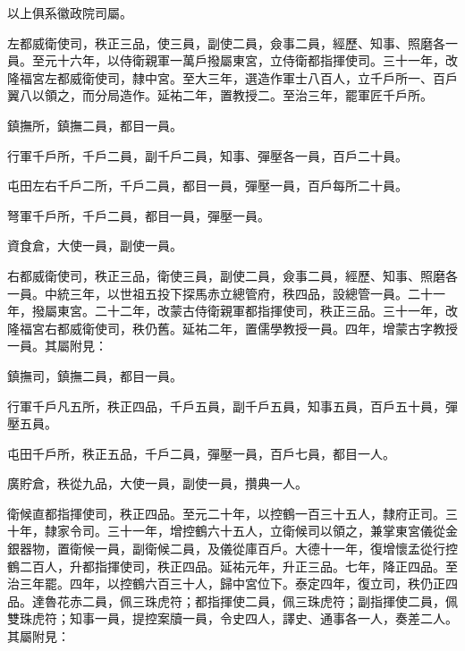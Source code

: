 \begin{pinyinscope}
 以上俱系徽政院司屬。



 左都威衛使司，秩正三品，使三員，副使二員，僉事二員，經歷、知事、照磨各一員。至元十六年，以侍衛親軍一萬戶撥屬東宮，立侍衛都指揮使司。三十一年，改隆福宮左都威衛使司，隸中宮。至大三年，選造作軍士八百人，立千戶所一、百戶翼八以領之，而分局造作。延祐二年，置教授二。至治三年，罷軍匠千戶所。



 鎮撫所，鎮撫二員，都目一員。



 行軍千戶所，千戶二員，副千戶二員，知事、彈壓各一員，百戶二十員。



 屯田左右千戶二所，千戶二員，都目一員，彈壓一員，百戶每所二十員。



 弩軍千戶所，千戶二員，都目一員，彈壓一員。



 資食倉，大使一員，副使一員。



 右都威衛使司，秩正三品，衛使三員，副使二員，僉事二員，經歷、知事、照磨各一員。中統三年，以世祖五投下探馬赤立總管府，秩四品，設總管一員。二十一年，撥屬東宮。二十二年，改蒙古侍衛親軍都指揮使司，秩正三品。三十一年，改隆福宮右都威衛使司，秩仍舊。延祐二年，置儒學教授一員。四年，增蒙古字教授一員。其屬附見：



 鎮撫司，鎮撫二員，都目一員。



 行軍千戶凡五所，秩正四品，千戶五員，副千戶五員，知事五員，百戶五十員，彈壓五員。



 屯田千戶所，秩正五品，千戶二員，彈壓一員，百戶七員，都目一人。



 廣貯倉，秩從九品，大使一員，副使一員，攢典一人。



 衛候直都指揮使司，秩正四品。至元二十年，以控鶴一百三十五人，隸府正司。三十年，隸家令司。三十一年，增控鶴六十五人，立衛候司以領之，兼掌東宮儀從金銀器物，置衛候一員，副衛候二員，及儀從庫百戶。大德十一年，復增懷孟從行控鶴二百人，升都指揮使司，秩正四品。延祐元年，升正三品。七年，降正四品。至治三年罷。四年，以控鶴六百三十人，歸中宮位下。泰定四年，復立司，秩仍正四品。達魯花赤二員，佩三珠虎符；都指揮使二員，佩三珠虎符；副指揮使二員，佩雙珠虎符；知事一員，提控案牘一員，令史四人，譯史、通事各一人，奏差二人。其屬附見：




\end{pinyinscope}
